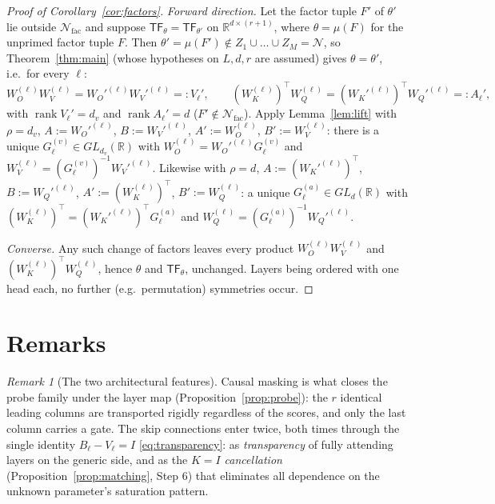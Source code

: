 \documentclass[11pt]{article}
\theoremstyle{definition}
\theoremstyle{remark}
\newtheorem{remark}[theorem]{Remark}
\theoremstyle{plain}
\newcommand{\R}{\mathbb{R}}
\newcommand{\cN}{\mathcal{N}}
\newcommand{\rank}{\operatorname{rank}}
\newcommand{\TF}{\mathsf{TF}}
\begin{document}
\begin{proof}[Proof of Corollary~\ref{cor:factors}]
\emph{Forward direction.}  Let the factor tuple $F'$ of $\theta'$ lie outside
$\cN_{\mathrm{fac}}$ and suppose $\TF_\theta=\TF_{\theta'}$ on
$\R^{d\times(r+1)}$, where $\theta=\mu(F)$ for the unprimed factor tuple $F$.  Then
$\theta'=\mu(F')\notin Z_1\cup\dots\cup Z_M=\cN$, so Theorem~\ref{thm:main} (whose
hypotheses on $L,d,r$ are assumed) gives $\theta=\theta'$, i.e.\ for every $\ell$:
\[
W_O^{(\ell)}W_V^{(\ell)}=W_O'^{(\ell)}W_V'^{(\ell)}=:V_\ell',
\qquad
(W_K^{(\ell)})^\top W_Q^{(\ell)}=(W_K'^{(\ell)})^\top W_Q'^{(\ell)}=:A_\ell',
\]
with $\rank V_\ell'=d_v$ and $\rank A_\ell'=d$ ($F'\notin\cN_{\mathrm{fac}}$).  Apply
Lemma~\ref{lem:lift} with $\rho=d_v$, $A:=W_O'^{(\ell)}$, $B:=W_V'^{(\ell)}$,
$A':=W_O^{(\ell)}$, $B':=W_V^{(\ell)}$: there is a unique
$G^{(v)}_\ell\in GL_{d_v}(\R)$ with $W_O^{(\ell)}=W_O'^{(\ell)}G^{(v)}_\ell$ and
$W_V^{(\ell)}=(G^{(v)}_\ell)^{-1}W_V'^{(\ell)}$.  Likewise with $\rho=d$,
$A:=(W_K'^{(\ell)})^\top$, $B:=W_Q'^{(\ell)}$, $A':=(W_K^{(\ell)})^\top$,
$B':=W_Q^{(\ell)}$: a unique $G^{(a)}_\ell\in GL_d(\R)$ with
$(W_K^{(\ell)})^\top=(W_K'^{(\ell)})^\top G^{(a)}_\ell$ and
$W_Q^{(\ell)}=(G^{(a)}_\ell)^{-1}W_Q'^{(\ell)}$.

\emph{Converse.}  Any such change of factors leaves every product
$W_O^{(\ell)}W_V^{(\ell)}$ and $(W_K^{(\ell)})^\top W_Q^{(\ell)}$, hence
$\theta$ and $\TF_\theta$, unchanged.  Layers being ordered with one head each, no
further (e.g.\ permutation) symmetries occur.
\end{proof}

\section{Remarks}\label{sec:remarks}

\begin{remark}[The two architectural features]\label{rem:architecture}
Causal masking is what closes the probe family under the layer map
(Proposition~\ref{prop:probe}): the $r$ identical leading columns are transported
rigidly regardless of the scores, and only the last column carries a gate.  The skip
connections enter twice, both times through the single identity $B_\ell-V_\ell=I$
\eqref{eq:transparency}: as \emph{transparency} of fully attending layers on the
generic side, and as the \emph{$K=I$ cancellation} (Proposition~\ref{prop:matching},
Step 6) that eliminates all dependence on the unknown parameter's saturation pattern.
\end{remark}
\end{document}
